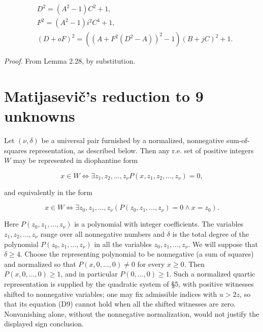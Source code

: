 \documentclass[11pt,a4paper]{article}
\begin{document}
\begin{align*}
& D^{2}=\left(A^{2}-1\right) C^{2}+1,  \tag{Q1}\\
& F^{2}=\left(A^{2}-1\right) i^{2} C^{4}+1,  \tag{Q2}\\
& (D+o F)^{2}=\left(\left(A+F^{2}\left(D^{2}-A\right)\right)^{2}-1\right)(B+j C)^{2}+1 . \tag{Q3}
\end{align*}


\noindent\emph{Proof.} From Lemma 2.28, by substitution.

\section{Matijasevič's reduction to 9 unknowns} Let $(\nu,\allowbreak \delta)$ be a universal pair furnished by a normalized, nonnegative sum-of-squares representation, as described below. Then any r.e. set of positive integers $W$ may be represented in diophantine form


\begin{equation*}
x \in W \Leftrightarrow \exists z_{1}, z_{2}, \ldots, z_{\nu} P\left(x, z_{1}, z_{2}, \ldots, z_{\nu}\right)=0, \tag{3.1}
\end{equation*}


and equivalently in the form


\begin{equation*}
x \in W \Leftrightarrow \exists z_{0}, z_{1}, \ldots, z_{\nu}\left(P\left(z_{0}, z_{1}, \ldots, z_{\nu}\right)=0 \wedge x=z_{0}\right) . \tag{3.2}
\end{equation*}


Here $P\left(z_{0},\allowbreak  z_{1},\allowbreak  \ldots,\allowbreak  z_{\nu}\right)$ is a polynomial with integer coefficients. The variables $z_{1},\allowbreak  z_{2},\allowbreak  \ldots,\allowbreak  z_{\nu}$ range over all nonnegative numbers and $\delta$ is the total degree of the polynomial $P\left(z_{0},\allowbreak  z_{1},\allowbreak  \ldots,\allowbreak  z_{\nu}\right)$ in all the variables $z_{0},\allowbreak  z_{1},\allowbreak  \ldots,\allowbreak  z_{\nu}$. We will suppose that $\delta \geq 4$. Choose the representing polynomial to be nonnegative (a sum of squares) and normalized so that $P(x,\allowbreak 0,\allowbreak \ldots,\allowbreak 0)\neq0$ for every $x\geq0$. Then $P(x,\allowbreak 0,\allowbreak \ldots,\allowbreak 0)\geq1$, and in particular $P(0,\allowbreak \ldots,\allowbreak 0)\geq1$. Such a normalized quartic representation is supplied by the quadratic system of §5, with positive witnesses shifted to nonnegative variables; one may fix admissible indices with $u>2z$, so that its equation (D9) cannot hold when all the shifted witnesses are zero. Nonvanishing alone, without the nonnegative normalization, would not justify the displayed sign conclusion.
\end{document}
